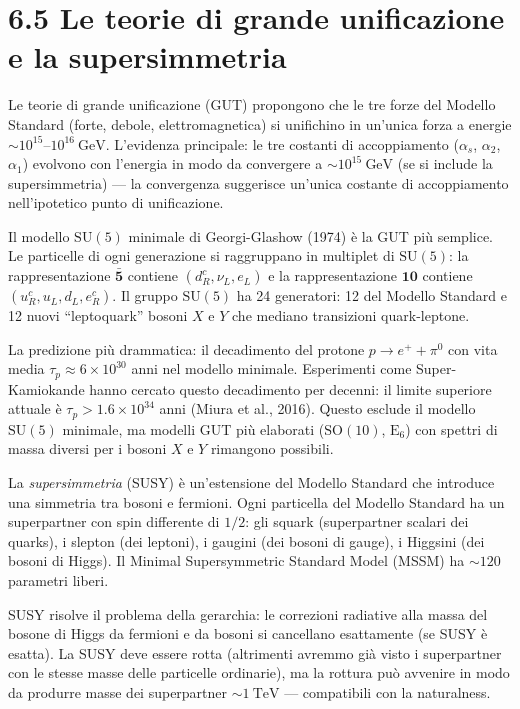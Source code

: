 \documentclass[11.5pt,a4paper,openany]{book}
\theoremstyle{remark}
\begin{document}
\section{6.5 Le teorie di grande unificazione e la supersimmetria}

Le teorie di grande unificazione (GUT) propongono che le tre forze del Modello Standard (forte, debole, elettromagnetica) si unifichino in un'unica forza a energie $\sim 10^{15}$--$10^{16}\ \text{GeV}$. L'evidenza principale: le tre costanti di accoppiamento ($\alpha_s$, $\alpha_2$, $\alpha_1$) evolvono con l'energia in modo da convergere a $\sim 10^{15}\ \text{GeV}$ (se si include la supersimmetria) --- la convergenza suggerisce un'unica costante di accoppiamento nell'ipotetico punto di unificazione.

Il modello $\mathrm{SU}(5)$ minimale di Georgi-Glashow (1974) è la GUT più semplice. Le particelle di ogni generazione si raggruppano in multiplet di $\mathrm{SU}(5)$: la rappresentazione $\bar{\mathbf{5}}$ contiene $(d^c_R, \nu_L, e_L)$ e la rappresentazione $\mathbf{10}$ contiene $(u^c_R, u_L, d_L, e^c_R)$. Il gruppo $\mathrm{SU}(5)$ ha 24 generatori: 12 del Modello Standard e 12 nuovi ``leptoquark'' bosoni $X$ e $Y$ che mediano transizioni quark-leptone.

La predizione più drammatica: il decadimento del protone $p \to e^+ + \pi^0$ con vita media $\tau_p \approx 6 \times 10^{30}$ anni nel modello minimale. Esperimenti come Super-Kamiokande hanno cercato questo decadimento per decenni: il limite superiore attuale è $\tau_p > 1.6 \times 10^{34}$ anni (Miura et al., 2016). Questo esclude il modello $\mathrm{SU}(5)$ minimale, ma modelli GUT più elaborati ($\mathrm{SO}(10)$, $\mathrm{E}_6$) con spettri di massa diversi per i bosoni $X$ e $Y$ rimangono possibili.

La \textit{supersimmetria} (SUSY) è un'estensione del Modello Standard che introduce una simmetria tra bosoni e fermioni. Ogni particella del Modello Standard ha un superpartner con spin differente di $1/2$: gli squark (superpartner scalari dei quarks), i slepton (dei leptoni), i gaugini (dei bosoni di gauge), i Higgsini (dei bosoni di Higgs). Il Minimal Supersymmetric Standard Model (MSSM) ha $\sim 120$ parametri liberi.

SUSY risolve il problema della gerarchia: le correzioni radiative alla massa del bosone di Higgs da fermioni e da bosoni si cancellano esattamente (se SUSY è esatta). La SUSY deve essere rotta (altrimenti avremmo già visto i superpartner con le stesse masse delle particelle ordinarie), ma la rottura può avvenire in modo da produrre masse dei superpartner $\sim 1\ \text{TeV}$ --- compatibili con la naturalness.
\end{document}
